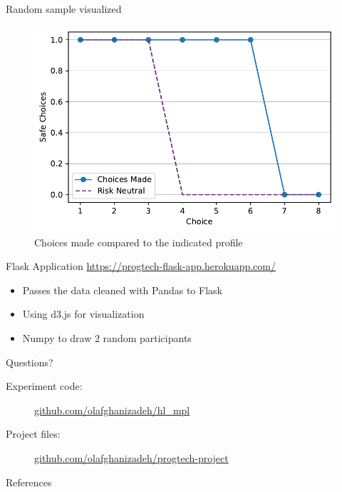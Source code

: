 \documentclass[10pt]{beamer}
\begin{document}
\begin{frame}{Random sample visualized}
  \begin{figure}[H]
  \includegraphics[width=0.9\columnwidth]{graphics/random_plot.pdf}
  \caption{Choices made compared to the indicated profile}
\end{figure}
\end{frame}


\begin{frame}{Flask Application}
  \url{https://progtech-flask-app.herokuapp.com/}
  \begin{itemize}
    \item Passes the data cleaned with Pandas to Flask
    \item Using d3.js for visualization
    \item Numpy to draw 2 random participants
  \end{itemize}
\end{frame}

{
\begin{frame}{Questions?}
  \begin{description}
      \item[Experiment code:] \href{https://github.com/olafghanizadeh/hl_mpl}{github.com/olafghanizadeh/hl\_mpl}
      \item[Project files:] \href{https://github.com/olafghanizadeh/progtech-project}{github.com/olafghanizadeh/progtech-project}
  \end{description}
\end{frame}
}

\begin{frame}{References}
  \printbibliography[heading=none]
\end{frame}
\end{document}
